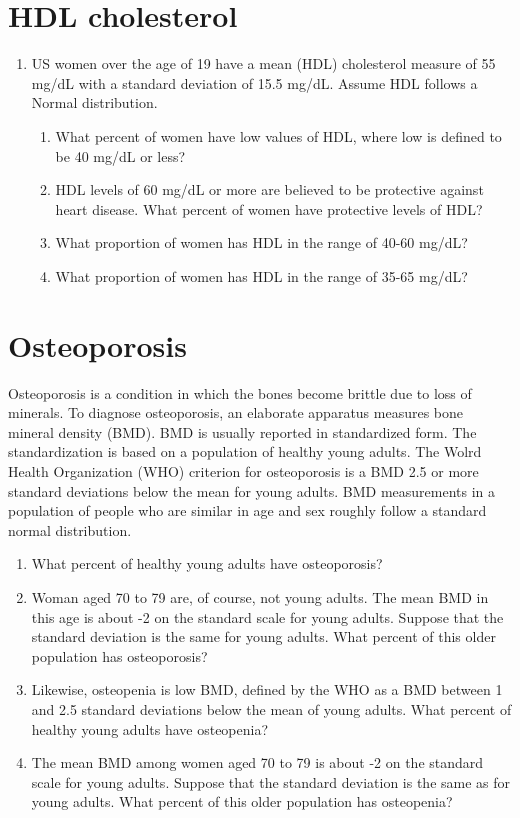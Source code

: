 \documentclass[letterpaper,9pt,twoside,printwatermark=false]{pinp}
\providecommand{\tightlist}{%
  \setlength{\itemsep}{0pt}\setlength{\parskip}{0pt}}
\begin{document}
\section{HDL cholesterol}\label{hdl-cholesterol}

\begin{enumerate}
\def\labelenumi{\alph{enumi}.}
\tightlist
\item
  US women over the age of 19 have a mean (HDL) cholesterol measure of
  55 mg/dL with a standard deviation of 15.5 mg/dL. Assume HDL follows a
  Normal distribution.

  \begin{enumerate}
  \def\labelenumii{\roman{enumii}.}
  \tightlist
  \item
    What percent of women have low values of HDL, where low is defined
    to be 40 mg/dL or less?
  \item
    HDL levels of 60 mg/dL or more are believed to be protective against
    heart disease. What percent of women have protective levels of HDL?
  \item
    What proportion of women has HDL in the range of 40-60 mg/dL?
  \item
    What proportion of women has HDL in the range of 35-65 mg/dL?
  \end{enumerate}
\end{enumerate}

\section{Osteoporosis}\label{osteoporosis}

Osteoporosis is a condition in which the bones become brittle due to
loss of minerals. To diagnose osteoporosis, an elaborate apparatus
measures bone mineral density (BMD). BMD is usually reported in
standardized form. The standardization is based on a population of
healthy young adults. The Wolrd Health Organization (WHO) criterion for
osteoporosis is a BMD 2.5 or more standard deviations below the mean for
young adults. BMD measurements in a population of people who are similar
in age and sex roughly follow a standard normal distribution.

\begin{enumerate}
\def\labelenumi{\alph{enumi}.}
\tightlist
\item
  What percent of healthy young adults have osteoporosis?
\item
  Woman aged 70 to 79 are, of course, not young adults. The mean BMD in
  this age is about -2 on the standard scale for young adults. Suppose
  that the standard deviation is the same for young adults. What percent
  of this older population has osteoporosis?
\item
  Likewise, osteopenia is low BMD, defined by the WHO as a BMD between 1
  and 2.5 standard deviations below the mean of young adults. What
  percent of healthy young adults have osteopenia?
\item
  The mean BMD among women aged 70 to 79 is about -2 on the standard
  scale for young adults. Suppose that the standard deviation is the
  same as for young adults. What percent of this older population has
  osteopenia?
\end{enumerate}
\end{document}
